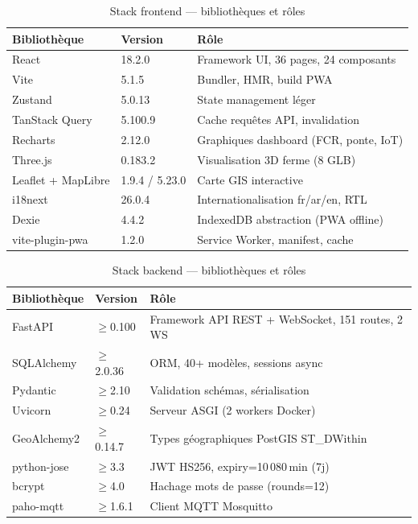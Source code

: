 \documentclass[12pt,a4paper,twoside]{report}
\newcounter{hi}
\begin{document}
\begin{table}[H]
\centering
\caption{Stack frontend — bibliothèques et rôles}
\label{tab:frontend_stack}
\begin{tabularx}{\linewidth}{llX}
\toprule
\textbf{Bibliothèque} & \textbf{Version} & \textbf{Rôle} \\
\midrule
React          & 18.2.0 & Framework UI, 36 pages, 24 composants \\
Vite           & 5.1.5  & Bundler, HMR, build PWA \\
Zustand        & 5.0.13 & State management léger \\
TanStack Query & 5.100.9& Cache requêtes API, invalidation \\
Recharts       & 2.12.0 & Graphiques dashboard (FCR, ponte, IoT) \\
Three.js       & 0.183.2& Visualisation 3D ferme (8 GLB) \\
Leaflet + MapLibre & 1.9.4 / 5.23.0 & Carte GIS interactive \\
i18next        & 26.0.4 & Internationalisation fr/ar/en, RTL \\
Dexie          & 4.4.2  & IndexedDB abstraction (PWA offline) \\
vite-plugin-pwa& 1.2.0  & Service Worker, manifest, cache \\
\bottomrule
\end{tabularx}
\end{table}

\begin{table}[H]
\centering
\caption{Stack backend — bibliothèques et rôles}
\label{tab:backend_stack}
\begin{tabularx}{\linewidth}{llX}
\toprule
\textbf{Bibliothèque} & \textbf{Version} & \textbf{Rôle} \\
\midrule
FastAPI        & $\geq$0.100  & Framework API REST + WebSocket, 151 routes, 2 WS \\
SQLAlchemy     & $\geq$2.0.36 & ORM, 40+ modèles, sessions async \\
Pydantic       & $\geq$2.10   & Validation schémas, sérialisation \\
Uvicorn        & $\geq$0.24   & Serveur ASGI (2 workers Docker) \\
GeoAlchemy2    & $\geq$0.14.7 & Types géographiques PostGIS ST\_DWithin \\
python-jose    & $\geq$3.3    & JWT HS256, expiry=10\,080\,min (7j) \\
bcrypt         & $\geq$4.0    & Hachage mots de passe (rounds=12) \\
paho-mqtt      & $\geq$1.6.1  & Client MQTT Mosquitto \\
\bottomrule
\end{tabularx}
\end{table}
\end{document}
